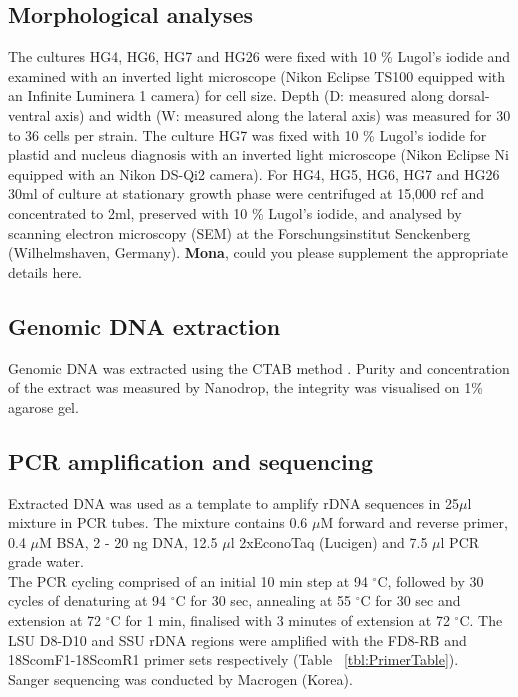 \documentclass[12pt]{article}
\begin{document}
\subsection{Morphological analyses}
The cultures HG4, HG6, HG7 and HG26 were fixed with 10 \% Lugol's iodide and examined with an inverted light microscope (Nikon Eclipse TS100 equipped with an Infinite Luminera 1 camera) for cell size. Depth (D: measured along dorsal-ventral axis) and width (W: measured along the lateral axis) was measured for 30 to 36 cells per strain.
The culture HG7 was fixed with 10 \% Lugol's iodide for plastid and nucleus diagnosis with an inverted light microscope (Nikon Eclipse Ni equipped with an Nikon DS-Qi2 camera).
For HG4, HG5, HG6, HG7 and HG26 30ml of culture at stationary growth phase were centrifuged at 15,000 rcf and concentrated to 2ml, preserved with 10 \% Lugol's iodide, and analysed by scanning electron microscopy (SEM) at the Forschungsinstitut Senckenberg (Wilhelmshaven, Germany). 
\textbf{Mona}, could you please supplement the appropriate details here. 

\subsection{Genomic DNA extraction}
Genomic DNA was extracted using the CTAB method \citep{zhou1999analysis}. Purity and concentration of the extract was measured by Nanodrop, the integrity was visualised on 1\% agarose gel.

\subsection{PCR amplification and sequencing}
Extracted DNA was used as a template to amplify rDNA sequences in 25$\mu$l mixture in PCR tubes. The mixture contains 0.6 $\mu$M forward and reverse primer, 0.4 $\mu$M BSA, 2 - 20 ng DNA, 12.5 $\mu$l 2xEconoTaq (Lucigen) and 7.5 $\mu$l PCR grade water.\\
The PCR cycling comprised of an initial 10 min step at 94 $^{\circ}$C, followed by 30 cycles of denaturing at 94 $^{\circ}$C for 30 sec, annealing at 55 $^{\circ}$C for 30 sec and extension at 72 $^{\circ}$C for 1 min, finalised with 3 minutes of extension at 72 $^{\circ}$C.
The LSU D8-D10 and SSU rDNA regions were amplified with the FD8-RB and 18ScomF1-18ScomR1 primer sets respectively (Table ~\ref{tbl:PrimerTable}).\\
Sanger sequencing was conducted by Macrogen (Korea).
\end{document}
